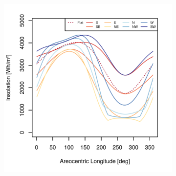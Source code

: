 \begin{figure}[h]
\captionsetup[subfigure]{justification=centering}
\vspace{-2ex}
\centering
    \setlength{\subfigureWidth}{0.50\textwidth}
    \setlength{\graphicsHeight}{80mm}
    \hypersetup{hidelinks=true}%
    \begin{subfigure}[t]{\subfigureWidth}
        \centering
            \includegraphics[height=\graphicsHeight]{sections/appendix/optimal-angles/plots/ismenius-cavus-tau-04-and-beta-optimal-based-on-direct-beam-irradiance-at-noon.png}
            \label{fig:sub:optimal-angles-ismenius-cavus-based-on-irradiance}
    \end{subfigure}\hfill
    \begin{subfigure}[t]{\subfigureWidth}
        \centering

\end{subfigure}
\end{figure}
